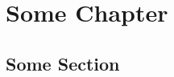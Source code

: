 \documentclass[11pt, book]{memoir}
\theoremstyle{plain}
\theoremstyle{plain}
\theoremstyle{remark}
\begin{document}
   

\tableofcontents

  



\chapter{Some Chapter}
\section{Some Section}
\end{document}

